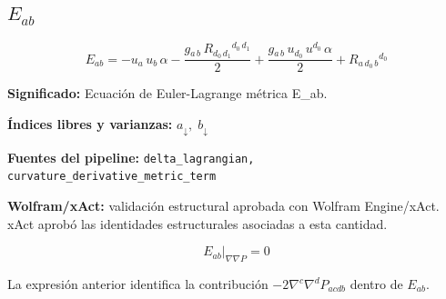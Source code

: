 \documentclass[11pt]{article}
\begin{document}
\subsection*{$ E_{ab} $}
\begin{dmath*}[breakdepth={5}]
E_{ab} = -u{}_{a}\,u{}_{b}\,\alpha - \frac{g{}_{a\,b}\,R{}_{d_{0}\,d_{1}}{}^{d_{0}\,d_{1}}}{2} + \frac{g{}_{a\,b}\,u{}_{d_{0}}\,u{}^{d_{0}}\,\alpha}{2} + R{}_{a\,d_{0}\,b}{}^{d_{0}}
\end{dmath*}
\par\vspace{1.2\baselineskip}\noindent
\begin{minipage}{\linewidth}
\textbf{Significado:} Ecuación de Euler-Lagrange métrica E\_ab.\par
\textbf{Índices libres y varianzas:} $ a_{\downarrow},\;b_{\downarrow} $\par
\textbf{Fuentes del pipeline:} \texttt{delta\_lagrangian, curvature\_derivative\_metric\_term}\par
\textbf{Wolfram/xAct:} validación estructural aprobada con Wolfram Engine/xAct. xAct aprobó las identidades estructurales asociadas a esta cantidad.\par
\end{minipage}
\begin{dmath*}[breakdepth={5}]
\left.E_{ab}\right|_{\nabla\nabla P} = 0
\end{dmath*}
\par\vspace{0.8\baselineskip}\noindent
\begin{minipage}{\linewidth}
La expresión anterior identifica la contribución $-2\nabla^c\nabla^dP_{acdb}$ dentro de $E_{ab}$.\par
\end{minipage}
\end{document}
